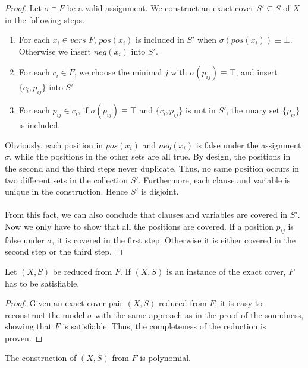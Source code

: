 \begin{proof}
    Let $\sigma \models F$ be a valid assignment. We construct an exact cover $S' \subseteq S$ of $X$ in the following steps.
\begin{enumerate}
    \item For each $x_i \in vars\; F$, $pos(x_i)$ is included in $S'$ when $\sigma(pos(x_i)) \equiv \bot$. Otherwise we insert $neg(x_i)$ into $S'$.
    \item For each $c_i \in F$, we choose the minimal $j$ with $\sigma(p_{ij}) \equiv \top$, and insert $\{c_i, p_{ij}\}$ into $S'$
    \item For each $p_{ij} \in c_i$, if $\sigma(p_{ij}) \equiv \top$ and $\{c_i, p_{ij}\}$ is not in $S'$, the unary set $\{p_{ij}\}$ is included. 
\end{enumerate}
Obviously, each position in $pos(x_i)$ and $neg(x_i)$ is false under the assignment $\sigma$, 
while the positions in the other sets are all true. By design, the positions in the second and the third steps never duplicate. 
Thus, no same position occurs in two different sets in the collection $S'$. 
Furthermore, each clause and variable is unique in the construction. Hence $S'$ is disjoint. \\\\
From this fact, we can also conclude that clauses and variables are covered in $S'$. 
Now we only have to show that all the positions are covered. If a position $p_{ij}$ is false under $\sigma$, 
it is covered in the first step. Otherwise it is either covered in the second step or the third step. 
\end{proof}
\begin{lemma}[Completeness]
    Let $(X, S)$ be reduced from $F$. If $(X, S)$ is an instance of the exact cover, $F$ has to be satisfiable.
\end{lemma}
\begin{proof}
    Given an exact cover pair $(X, S)$ reduced from $F$, 
    it is easy to reconstruct the model $\sigma$ with the same approach as in the proof of the soundness, 
    showing that $F$ is satisfiable. Thus, the completeness of the reduction is proven. 
\end{proof}
\begin{lemma}
    The construction of $(X, S)$ from $F$ is polynomial. 
\end{lemma}
